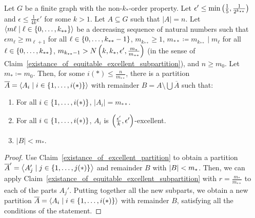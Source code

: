     \lemma[Claim 5.14.1a]\label{existance_of_excellent_partition_with_equal_size}
        Let $G$ be a finite graph with the non-$k_{*}$-order property.
        Let $\epsilon' \leq \min \left( \frac{1}{5}, \frac{1}{2^{k_{**}}} \right)$ and $\epsilon \leq \frac{1}{4k} \epsilon'$ for some $k > 1$.
        Let $A \subseteq G$ such that $|A| = n$.
        Let $\left< m\ell \mid \ell \in \left\{ 0, \dots, k_{**} \right\} \right>$ be a decreasing sequence of natural numbers such that
        $\epsilon m_{\ell} \geq m_{\ell+1}$ for all $\ell \in \left\{ 0, \dots, k_{**}-1 \right\}$, $m_{k_{**}} \geq 1$,
        $m_{**} \coloneq m_{k_{**}} \mid m_\ell$ for all $\ell \in \left\{ 0, \dots, k_{**} \right\}$,
        $m_{k_{**}-1} > N\left( k, k_*, \epsilon', \frac{m_*}{m_{**}} \right)$
        (in the sense of Claim~\ref{existance_of_equitable_excellent_subpartition}), and $n \geq m_0$.
        Let $m_* \coloneq m_0$.
        Then, for some $i(*) \leq \frac{n}{m_{**}}$, there is a partition $\overline{A} = \left< A_i \mid i \in \left\{ 1, \dots, i(*) \right\} \right>$
        with remainder $B = A \setminus \bigcup \overline{A}$ such that:
        \begin{enumerate}[label=(\alph*), ref=\alph*]
            \item \label{itm:5.14.1a.a} For all $i \in \left\{ 1, \dots, i(*) \right\}$, $|A_i| = m_{**}$.
            \item \label{itm:5.14.1a.c} For all $i \in \left\{ 1, \dots, i(*) \right\}$, $A_i$ is $\left( \frac{\epsilon'}{k}, \epsilon' \right)$-excellent.
            \item \label{itm:5.14.1a.d} $|B| < m_*$.
        \end{enumerate}
        \begin{proof}
            Use Claim~\ref{existance_of_excellent_partition} to obtain a partition
            $\overline{A}' = \left< A_j' \mid j \in \left\{ 1, \dots, j(*) \right\} \right>$ and remainder $B$ with $\left| B \right| < m_*$.
            Then, we can apply Claim~\ref{existance_of_equitable_excellent_subpartition} with $r = \frac{m_*}{m_{**}}$ to each of
            the parts $A_j'$.
            Putting together all the new subparts, we obtain a new partition $\overline{A} = \left< A_i \mid i \in \left\{ 1, \dots, i(*) \right\} \right>$
            with remainder $B$, satisfying all the conditions of the statement.
        \end{proof}

